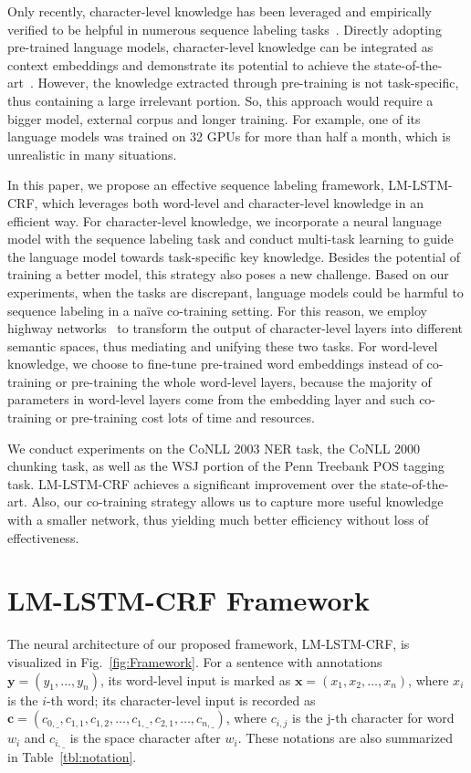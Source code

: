 \documentclass[letterpaper]{article} %
\newcommand{\our}{\textsc{LM-LSTM-CRF}\xspace}
\def \myspace {\_}
\def \c {\mathbf{c}}
\def \x {\mathbf{x}}
\def \y {\mathbf{y}}
\begin{document}
Only recently, character-level knowledge has been leveraged and empirically verified to be helpful in numerous sequence labeling tasks~\cite{peters2017semi,rei2017semi}.
Directly adopting pre-trained language models, character-level knowledge can be integrated as context embeddings and demonstrate its potential to achieve the state-of-the-art~\cite{peters2017semi}.
However, the knowledge extracted through pre-training is not task-specific, thus containing a large irrelevant portion.
So,
this approach would require a bigger model, external corpus and longer training.
For example, one of its language models was trained on 32 GPUs for more than half a month, which is unrealistic in many situations.

In this paper, we propose an effective sequence labeling framework, \our, 
which leverages both word-level and character-level knowledge in an efficient way.
For character-level knowledge, we incorporate a neural language model with the sequence labeling task
and conduct multi-task learning to guide the language model towards task-specific key knowledge.
Besides the potential of training a better model, this strategy also poses a new challenge.
Based on our experiments, when the tasks are discrepant, language models could be harmful to sequence labeling in a na\"ive co-training setting.
For this reason, we employ highway networks~\cite{srivastava2015highway} to transform the output of character-level layers into different semantic spaces,
thus mediating and unifying these two tasks.
For word-level knowledge, we choose to fine-tune pre-trained word embeddings instead of co-training or pre-training the whole word-level layers,
because the majority of parameters in word-level layers come from the embedding layer and such co-training or pre-training cost lots of time and resources.

We conduct experiments on the CoNLL 2003 NER task, the CoNLL 2000 chunking task, as well as the WSJ portion of the Penn Treebank POS tagging task.
\our achieves a significant improvement over the state-of-the-art.
Also, our co-training strategy allows us to capture more useful knowledge with a smaller network, thus yielding much better efficiency without loss of effectiveness. 


\section{\our Framework}
\label{sect:model}

The neural architecture of our proposed framework, \our, is visualized in Fig.~\ref{fig:Framework}.
For a sentence with annotations $\y=(y_1, \dots, y_n )$, its word-level input is marked as $\x=(x_1, x_2, \dots, x_n)$, where $x_i$ is the $i$-th word; its character-level input is recorded as $\c=(c_{0,\myspace}, c_{1, 1}, c_{1, 2}, \dots, c_{1, \myspace}, c_{2, 1}, \dots, c_{n,\myspace})$, where $c_{i, j}$ is the j-th character for word $w_i$ and $c_{i, \myspace}$ is the space character after $w_i$.
These notations are also summarized in Table~\ref{tbl:notation}.
\end{document}
